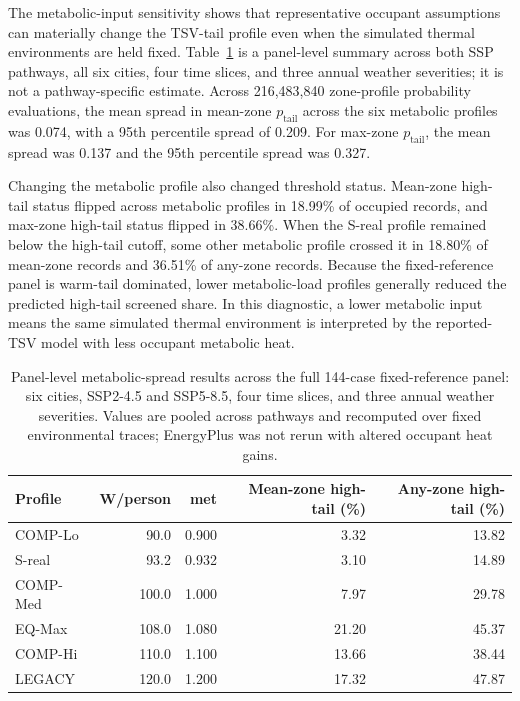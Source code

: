 The metabolic-input sensitivity shows that representative occupant assumptions can materially change the TSV-tail profile even when the simulated thermal environments are held fixed. Table~\ref{tab:metabolic_scenario_summary} is a panel-level summary across both SSP pathways, all six cities, four time slices, and three annual weather severities; it is not a pathway-specific estimate. Across 216{,}483{,}840 zone-profile probability evaluations, the mean spread in mean-zone $p_{\mathrm{tail}}$ across the six metabolic profiles was 0.074, with a 95th percentile spread of 0.209. For max-zone $p_{\mathrm{tail}}$, the mean spread was 0.137 and the 95th percentile spread was 0.327.

Changing the metabolic profile also changed threshold status. Mean-zone high-tail status flipped across metabolic profiles in 18.99\% of occupied records, and max-zone high-tail status flipped in 38.66\%. When the S-real profile remained below the high-tail cutoff, some other metabolic profile crossed it in 18.80\% of mean-zone records and 36.51\% of any-zone records. Because the fixed-reference panel is warm-tail dominated, lower metabolic-load profiles generally reduced the predicted high-tail screened share. In this diagnostic, a lower metabolic input means the same simulated thermal environment is interpreted by the reported-TSV model with less occupant metabolic heat.

\begin{table}[htbp]
\centering
\caption{Panel-level metabolic-spread results across the full 144-case fixed-reference panel: six cities, SSP2-4.5 and SSP5-8.5, four time slices, and three annual weather severities. Values are pooled across pathways and recomputed over fixed environmental traces; EnergyPlus was not rerun with altered occupant heat gains.}
\label{tab:metabolic_scenario_summary}
\footnotesize
\begin{tabular}{lrrrr}
\toprule
\textbf{Profile} & \textbf{W/person} & \textbf{met} & \textbf{Mean-zone high-tail (\%)} & \textbf{Any-zone high-tail (\%)} \\
\midrule
COMP-Lo & 90.0 & 0.900 & 3.32 & 13.82 \\
S-real & 93.2 & 0.932 & 3.10 & 14.89 \\
COMP-Med & 100.0 & 1.000 & 7.97 & 29.78 \\
EQ-Max & 108.0 & 1.080 & 21.20 & 45.37 \\
COMP-Hi & 110.0 & 1.100 & 13.66 & 38.44 \\
LEGACY & 120.0 & 1.200 & 17.32 & 47.87 \\
\bottomrule
\end{tabular}
\end{table}


